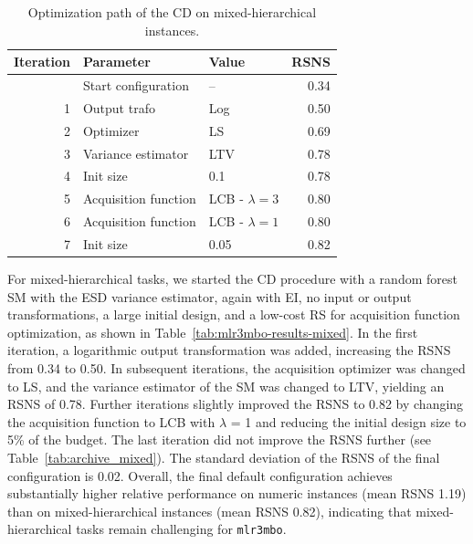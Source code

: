 \documentclass[12pt,letterpaper]{article}
\begin{document}
\begin{table}[ht]
  \centering
  \caption{Optimization path of the CD on mixed-hierarchical instances.}
  \label{tab:optimization-path-mixed}
  \begin{tabular}{rllr}
    \toprule
    Iteration & Parameter            & Value             & RSNS \\
    \midrule
              & Start configuration  & --                & 0.34 \\
    1         & Output trafo         & Log               & 0.50 \\
    2         & Optimizer            & LS                & 0.69 \\
    3         & Variance estimator   & LTV               & 0.78 \\
    4         & Init size            & 0.1               & 0.78 \\
    5         & Acquisition function & LCB - $\lambda=3$ & 0.80 \\
    6         & Acquisition function & LCB - $\lambda=1$ & 0.80 \\
    7         & Init size            & 0.05              & 0.82 \\
    \bottomrule
  \end{tabular}
\end{table}

For mixed-hierarchical tasks, we started the CD procedure with a random forest SM with the ESD variance estimator, again with EI, no input or output transformations, a large initial design, and a low-cost RS for acquisition function optimization, as shown in Table~\ref{tab:mlr3mbo-results-mixed}.
In the first iteration, a logarithmic output transformation was added, increasing the RSNS from 0.34 to 0.50.
In subsequent iterations, the acquisition optimizer was changed to LS, and the variance estimator of the SM was changed to LTV, yielding an RSNS of 0.78.
Further iterations slightly improved the RSNS to 0.82 by changing the acquisition function to LCB with $\lambda$ = 1 and reducing the initial design size to 5\% of the budget.
The last iteration did not improve the RSNS further (see Table~\ref{tab:archive_mixed}).
The standard deviation of the RSNS of the final configuration is 0.02.
Overall, the final default configuration achieves substantially higher relative performance on numeric instances (mean RSNS 1.19) than on mixed-hierarchical instances (mean RSNS 0.82), indicating that mixed-hierarchical tasks remain challenging for \texttt{mlr3mbo}.
\end{document}
